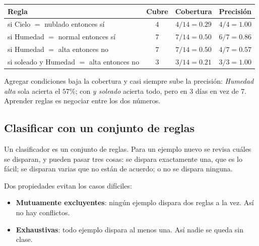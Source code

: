 \documentclass[11pt,letterpaper]{article}
\begin{document}
\begin{ejemplo}
    \begin{center}
    \small
    \begin{tabular}{lccc}
        \toprule
        \textbf{Regla} & \textbf{Cubre} & \textbf{Cobertura}
        & \textbf{Precisión} \\
        \midrule
        si Cielo $=$ nublado entonces sí & $4$ & $4/14 = 0.29$
            & $4/4 = 1.00$ \\
        si Humedad $=$ normal entonces sí & $7$ & $7/14 = 0.50$
            & $6/7 = 0.86$ \\
        si Humedad $=$ alta entonces no & $7$ & $7/14 = 0.50$
            & $4/7 = 0.57$ \\
        si soleado y Humedad $=$ alta entonces no & $3$
            & $3/14 = 0.21$ & $3/3 = 1.00$ \\
        \bottomrule
    \end{tabular}
    \end{center}
    Agregar condiciones baja la cobertura y casi siempre sube la
    precisión: \textit{Humedad alta} sola acierta el $57\%$; con
    \textit{y soleado} acierta todo, pero en $3$ días en vez de $7$.
    Aprender reglas es negociar entre los dos números.
\end{ejemplo}


\subsection*{Clasificar con un conjunto de reglas}

Un clasificador es un conjunto de reglas. Para un ejemplo nuevo se
revisa cuáles se disparan, y pueden pasar tres cosas: se dispara
exactamente una, que es lo fácil; se disparan varias que no están de
acuerdo; o no se dispara ninguna.

Dos propiedades evitan los casos difíciles:

\begin{itemize}[itemsep=0.3em]
    \item \textbf{Mutuamente excluyentes}: ningún ejemplo dispara dos
          reglas a la vez. Así no hay conflictos.
    \item \textbf{Exhaustivas}: todo ejemplo dispara al menos una. Así
          nadie se queda sin clase.
\end{itemize}
\end{document}

